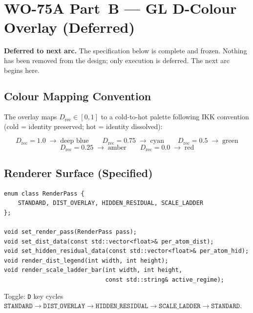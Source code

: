 \documentclass[11pt,a4paper]{article}
\theoremstyle{definition}
\newcommand{\Drec}{D_{\mathrm{rec}}}
\begin{document}
\section{WO-75A Part~B --- GL D-Colour Overlay (Deferred)}\label{sec:partb}

\begin{mdframed}[style=warnbox]
\textbf{Deferred to next arc.}\quad
The specification below is complete and frozen.  Nothing has been removed
from the design; only execution is deferred.  The next arc begins here.
\end{mdframed}

\subsection{Colour Mapping Convention}

The overlay maps $\Drec \in [0,1]$ to a cold-to-hot palette following IKK
convention (cold = identity preserved; hot = identity dissolved):

\[
\Drec = 1.0 \;\longrightarrow\; \text{deep blue}
\qquad
\Drec = 0.75 \;\longrightarrow\; \text{cyan}
\qquad
\Drec = 0.5 \;\longrightarrow\; \text{green}
\]
\[
\Drec = 0.25 \;\longrightarrow\; \text{amber}
\qquad
\Drec = 0.0 \;\longrightarrow\; \text{red}
\]

\subsection{Renderer Surface (Specified)}

\begin{lstlisting}[style=eventprint,
  caption={New renderer API surface -- WO-75A Part~B.}]
enum class RenderPass {
	STANDARD, DIST_OVERLAY, HIDDEN_RESIDUAL, SCALE_LADDER
};

void set_render_pass(RenderPass pass);
void set_dist_data(const std::vector<float>& per_atom_dist);
void set_hidden_residual_data(const std::vector<float>& per_atom_hid);
void render_dist_legend(int width, int height);
void render_scale_ladder_bar(int width, int height,
							 const std::string& active_regime);
\end{lstlisting}

Toggle: \texttt{D} key cycles
$\texttt{STANDARD} \to \texttt{DIST\_OVERLAY}
 \to \texttt{HIDDEN\_RESIDUAL} \to \texttt{SCALE\_LADDER}
 \to \texttt{STANDARD}$.
\end{document}
